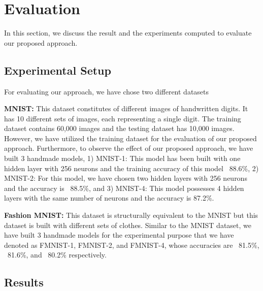 \section{Evaluation}
\label{sec:evaluation}
In this section, we discuss the result and the experiments computed to evaluate our proposed approach.
\subsection{Experimental Setup}
For evaluating our approach, we have chose two different datasets

\textbf{MNIST:}
This dataset constitutes of different images of handwritten digits. It has 10 different sets of images, each representing a single digit. The training dataset contains 60,000 images and the testing dataset has 10,000 images. However, we have utilized the training dataset for the evaluation of our proposed approach. Furthermore, to observe the effect of our proposed approach, we have built 3 handmade models, 1) MNIST-1: This model has been built with one hidden layer with 256 neurons and the training accuracy of this model ~88.6\%, 2) MNIST-2: For this model, we have chosen two hidden layers with 256 neurons and the accuracy is ~88.5\%, and 3) MNIST-4: This model possesses 4 hidden layers with the same number of neurons and the accuracy is 87.2\%.

\textbf{Fashion MNIST:}
This dataset is structurally equivalent to the MNIST but this dataset is built with different sets of clothes. Similar to the MNIST dataset, we have built 3 handmade models for the experimental purpose that we have denoted as FMNIST-1, FMNIST-2, and FMNIST-4, whose accuracies are ~81.5\%, ~81.6\%, and ~80.2\% respectively.
\subsection{Results}
